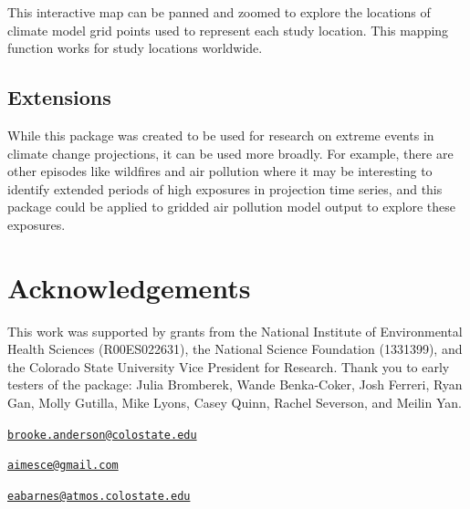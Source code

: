 \noindent This interactive map can be panned and zoomed to explore the
locations of climate model grid points used to represent each study
location. This mapping function works for study locations worldwide.

\subsection{Extensions}\label{extensions}

While this package was created to be used for research on extreme events
in climate change projections, it can be used more broadly. For example,
there are other episodes like wildfires and air pollution where it may
be interesting to identify extended periods of high exposures in
projection time series, and this package could be applied to gridded air
pollution model output to explore these exposures.

\section{Acknowledgements}\label{acknowledgements}

This work was supported by grants from the National Institute of
Environmental Health Sciences (R00ES022631), the National Science
Foundation (1331399), and the Colorado State University Vice President
for Research. Thank you to early testers of the package: Julia
Bromberek, Wande Benka-Coker, Josh Ferreri, Ryan Gan, Molly Gutilla,
Mike Lyons, Casey Quinn, Rachel Severson, and Meilin Yan.



\address{%
G. Brooke Anderson\\
Colorado State University\\
Department of Environmental \& Radiological Health Sciences\\ 1681 Campus Delivery\\ Fort Collins, Colorado 80523\\
}
\href{mailto:brooke.anderson@colostate.edu}{\nolinkurl{brooke.anderson@colostate.edu}}

\address{%
Colin Eason\\
Colorado State University\\
Department of Computer Science\\ 1873 Campus Delivery\\ Fort Collins, Colorado 80523\\
}
\href{mailto:aimesce@gmail.com}{\nolinkurl{aimesce@gmail.com}}

\address{%
Elizabeth A. Barnes\\
Colorado State University\\
Department of Atmospheric Science\\ 1371 Campus Delivery\\ Fort Collins, CO 80523\\
}
\href{mailto:eabarnes@atmos.colostate.edu}{\nolinkurl{eabarnes@atmos.colostate.edu}}

